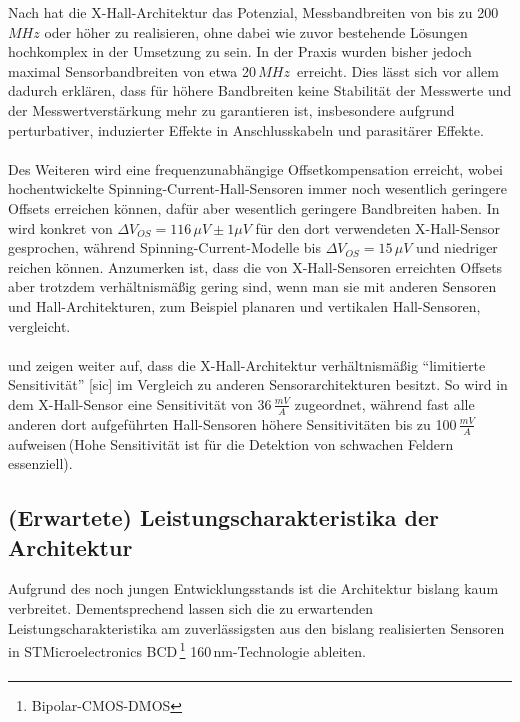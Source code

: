 \documentclass[12pt, a4paper]{article}
\begin{document}
Nach \cite{cres21} hat die X-Hall-Architektur das Potenzial, Messbandbreiten von bis zu 200\,$MHz$ oder höher zu realisieren, ohne dabei wie zuvor bestehende Lösungen hochkomplex in der Umsetzung zu sein. In der Praxis wurden bisher jedoch maximal Sensorbandbreiten von etwa 20\,$MHz$\,\cite{cres19} erreicht.\newline
Dies lässt sich vor allem dadurch erklären, dass für höhere Bandbreiten keine Stabilität der Messwerte und der Messwertverstärkung mehr zu garantieren ist, insbesondere aufgrund perturbativer, induzierter Effekte in Anschlusskabeln und parasitärer Effekte.\paragraph{}
Des Weiteren wird eine frequenzunabhängige Offsetkompensation erreicht, wobei hochentwickelte Spinning-Current-Hall-Sensoren immer noch wesentlich geringere Offsets erreichen können, dafür aber wesentlich geringere Bandbreiten haben. In \cite{cres22} wird konkret von $\Delta{V_{OS}}=116\,\mu{V}\pm1\mu{V}$ für den dort verwendeten X-Hall-Sensor gesprochen, während Spinning-Current-Modelle bis $\Delta{V_{OS}}=15\,\mu{V}$ und niedriger reichen können. Anzumerken ist, dass die von X-Hall-Sensoren erreichten Offsets aber trotzdem verhältnismäßig gering sind, wenn man sie mit anderen Sensoren und Hall-Architekturen, zum Beispiel planaren und vertikalen Hall-Sensoren, vergleicht.\paragraph{}
\cite{cres22} und \cite{cres23} zeigen weiter auf, dass die X-Hall-Architektur verhältnismäßig ``limitierte Sensitivität'' [sic] im Vergleich zu anderen Sensorarchitekturen besitzt. So wird in \cite{cres21Hall} dem X-Hall-Sensor eine Sensitivität von 36\,$\frac{mV}{A}$ zugeordnet, während fast alle anderen dort aufgeführten Hall-Sensoren höhere Sensitivitäten bis zu 100\,$\frac{mV}{A}$ aufweisen\,(Hohe Sensitivität ist für die Detektion von schwachen Feldern essenziell). 


\subsection{(Erwartete) Leistungscharakteristika der Architektur}
Aufgrund des noch jungen Entwicklungsstands ist die Architektur bislang kaum verbreitet. Dementsprechend lassen sich die zu erwartenden Leistungscharakteristika am zuverlässigsten aus den bislang realisierten Sensoren in STMicroelectronics BCD\,\footnote{Bipolar-CMOS-DMOS} 160\,nm-Technologie ableiten.\paragraph{}
\end{document}
